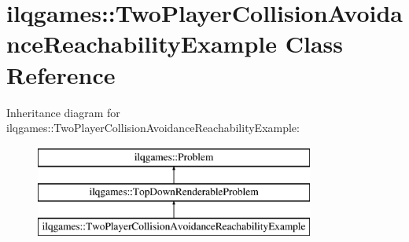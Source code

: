 \hypertarget{classilqgames_1_1_two_player_collision_avoidance_reachability_example}{}\section{ilqgames\+:\+:Two\+Player\+Collision\+Avoidance\+Reachability\+Example Class Reference}
\label{classilqgames_1_1_two_player_collision_avoidance_reachability_example}
Inheritance diagram for ilqgames\+:\+:Two\+Player\+Collision\+Avoidance\+Reachability\+Example\+:\begin{figure}[H]
\begin{center}
\leavevmode
\includegraphics[height=3.000000cm]{classilqgames_1_1_two_player_collision_avoidance_reachability_example}
\end{center}
\end{figure}
